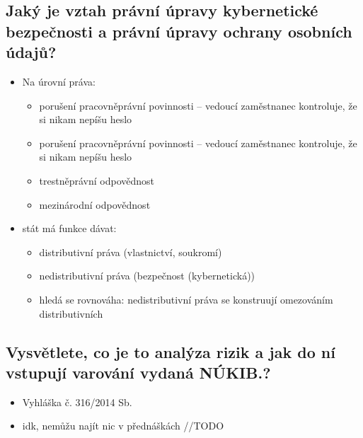 \subsection{ Jaký je vztah právní úpravy kybernetické bezpečnosti a právní úpravy ochrany osobních údajů?}
\begin{itemize}
    \item Na úrovní práva:
    \begin{itemize}
        \item porušení pracovněprávní povinnosti – vedoucí zaměstnanec kontroluje, že si nikam nepíšu heslo
        \item  porušení pracovněprávní povinnosti – vedoucí zaměstnanec kontroluje, že si nikam nepíšu heslo
        \item trestněprávní odpovědnost
        \item mezinárodní odpovědnost
    \end{itemize}
    \item stát má funkce dávat:
    \begin{itemize}
        \item distributivní práva (vlastnictví, soukromí)
        \item nedistributivní práva (bezpečnost (kybernetická))
        \item hledá se rovnováha: nedistributivní práva se konstruují omezováním distributivních
    \end{itemize}
\end{itemize}

\subsection{Vysvětlete, co je to analýza rizik a jak do ní vstupují varování vydaná NÚKIB.?}
\begin{itemize}
    \item Vyhláška č. 316/2014 Sb.
    \item idk, nemůžu najít nic v přednáškách //TODO
\end{itemize}
